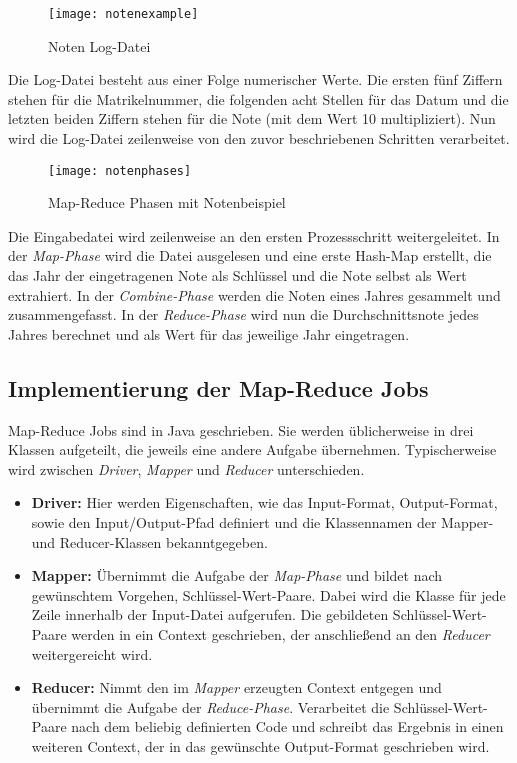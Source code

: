 \begin{figure}[!htb]
	\centering
	\texttt{[image: notenexample]}
	\caption{Noten Log-Datei}
	\label{img:notenexample}
\end{figure}

Die Log-Datei besteht aus einer Folge numerischer Werte. Die ersten fünf Ziffern stehen für die Matrikelnummer, die folgenden acht Stellen für das Datum und die letzten beiden Ziffern stehen für die Note (mit dem Wert 10 multipliziert). Nun wird die Log-Datei zeilenweise von den zuvor beschriebenen Schritten verarbeitet.

\begin{figure}[!htb]
	\centering
	\texttt{[image: notenphases]}
	\caption{Map-Reduce Phasen mit Notenbeispiel}
	\label{img:notenphases}
\end{figure}

Die Eingabedatei wird zeilenweise an den ersten Prozessschritt weitergeleitet. In der \textit{Map-Phase} wird die Datei ausgelesen und eine erste Hash-Map erstellt, die das Jahr der eingetragenen Note als Schlüssel und die Note selbst als Wert extrahiert. In der \textit{Combine-Phase} werden die Noten eines Jahres gesammelt und zusammengefasst. In der \textit{Reduce-Phase} wird nun die Durchschnittsnote jedes Jahres berechnet und als Wert für das jeweilige Jahr eingetragen. 

\pagebreak

\subsection{Implementierung der Map-Reduce Jobs}
\label{subsec:implementmapreducejobs}

Map-Reduce Jobs sind in Java geschrieben. Sie werden üblicherweise in drei Klassen aufgeteilt, die jeweils eine andere Aufgabe übernehmen. Typischerweise wird zwischen \textit{Driver}, \textit{Mapper} und \textit{Reducer} unterschieden.

\begin{itemize}
\item \textbf{Driver:} Hier werden Eigenschaften, wie das Input-Format, Output-Format, sowie den Input/Output-Pfad definiert und die Klassennamen der Mapper- und Reducer-Klassen bekanntgegeben. 
\item \textbf{Mapper:} Übernimmt die Aufgabe der \textit{Map-Phase} und bildet nach gewünschtem Vorgehen, Schlüssel-Wert-Paare. Dabei wird die Klasse für jede Zeile innerhalb der Input-Datei aufgerufen. Die gebildeten Schlüssel-Wert-Paare werden in ein Context geschrieben, der anschließend an den \textit{Reducer} weitergereicht wird.
\item \textbf{Reducer:} Nimmt den im \textit{Mapper} erzeugten Context entgegen und übernimmt die Aufgabe der \textit{Reduce-Phase}. Verarbeitet die Schlüssel-Wert-Paare nach dem beliebig definierten Code und schreibt das Ergebnis in einen weiteren Context, der in das gewünschte Output-Format geschrieben wird.
\end{itemize} 

